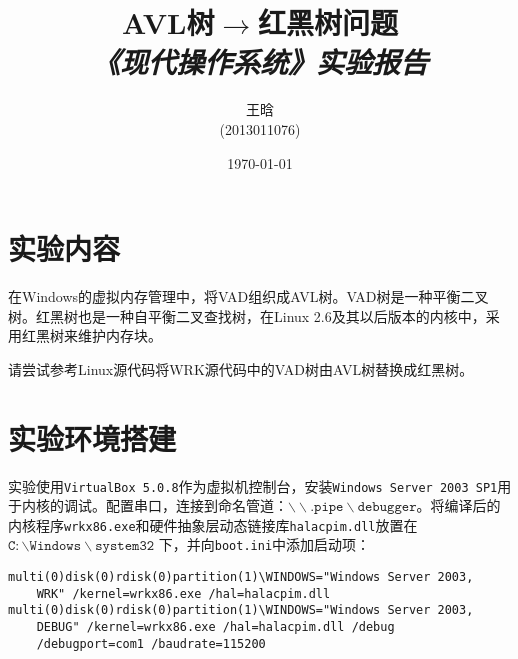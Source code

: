 \documentclass[a4paper, 11pt]{article}
\newcommand{\xiaosihao}{\fontsize{12pt}{\baselineskip}\selectfont}
\begin{document}
\newtheorem{example}{例}             %
\newtheorem{algorithm}{算法}
\newtheorem{theorem}{定理}[section]  %
\newtheorem{definition}{定义}
\newtheorem{axiom}{公理}
\newtheorem{property}{性质}
\newtheorem{proposition}{命题}
\newtheorem{lemma}{引理}
\newtheorem{corollary}{推论}
\newtheorem{remark}{注解}
\newtheorem{condition}{条件}
\newtheorem{conclusion}{结论}
\newtheorem{assumption}{假设}
\newtheorem{problem}{问题}
\renewcommand{\contentsname}{目录}  %
\renewcommand{\abstractname}{摘要}  %
\renewcommand{\refname}{参考文献}   %
\renewcommand{\indexname}{索引}
\renewcommand{\figurename}{图}
\renewcommand{\tablename}{表}
\renewcommand{\appendixname}{附录}

    \title{\textbf{AVL树$\rightarrow$红黑树问题}\\\xiaosihao \emph{《现代操作系统》实验报告}}
    \author{王晗\\(2013011076)}
    \date{\today}
    \maketitle

    \section{实验内容}
        在Windows的虚拟内存管理中，将VAD组织成AVL树。VAD树是一种平衡二叉树。红黑树也是一种自平衡二叉查找树，在Linux 2.6及其以后版本的内核中，采用红黑树来维护内存块。

        请尝试参考Linux源代码将WRK源代码中的VAD树由AVL树替换成红黑树。

    \section{实验环境搭建}
        实验使用\texttt{VirtualBox 5.0.8}作为虚拟机控制台，安装\texttt{Windows Server 2003 SP1}用于内核的调试。配置串口，连接到命名管道：$\mathtt{\backslash\backslash.pipe\backslash debugger}$。将编译后的内核程序\texttt{wrkx86.exe}和硬件抽象层动态链接库\texttt{halacpim.dll}放置在$\mathtt{C:\backslash Windows\backslash system32}$ 下，并向\texttt{boot.ini}中添加启动项：
\begin{lstlisting}
multi(0)disk(0)rdisk(0)partition(1)\WINDOWS="Windows Server 2003, 
    WRK" /kernel=wrkx86.exe /hal=halacpim.dll
multi(0)disk(0)rdisk(0)partition(1)\WINDOWS="Windows Server 2003, 
    DEBUG" /kernel=wrkx86.exe /hal=halacpim.dll /debug
    /debugport=com1 /baudrate=115200
\end{lstlisting}
        
\end{document}
